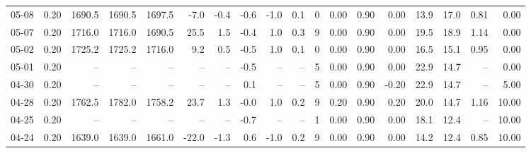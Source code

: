 \begin{threeparttable}
{\begin{tabular}{lrrrrrrrrrrrrrrrrr}
  05-08 &     0.20 & 1690.5 & 1690.5 & 1697.5 &       -7.0 &           -0.4 &                      -0.6 &                     -1.0 &                 0.1 &              0 &       0.00 &      0.90 &           0.00 &             13.9 &                17.0 &            0.81 &                   0.00 \\
  05-07 &     0.20 & 1716.0 & 1716.0 & 1690.5 &       25.5 &            1.5 &                      -0.4 &                      1.0 &                 0.3 &              9 &       0.00 &      0.90 &           0.00 &             19.5 &                18.9 &            1.14 &                   0.00 \\
  05-02 &     0.20 & 1725.2 & 1725.2 & 1716.0 &        9.2 &            0.5 &                      -0.5 &                      1.0 &                 0.1 &              0 &       0.00 &      0.90 &           0.00 &             16.5 &                15.1 &            0.95 &                   0.00 \\
  05-01 &     0.20 &     -- &     -- &     -- &         -- &             -- &                      -0.5 &                       -- &                  -- &              5 &       0.00 &      0.90 &           0.00 &             22.9 &                14.7 &              -- &                   0.00 \\
  04-30 &     0.20 &     -- &     -- &     -- &         -- &             -- &                       0.1 &                       -- &                  -- &              5 &       0.00 &      0.90 &          -0.20 &             22.9 &                14.7 &              -- &                   5.00 \\
  04-28 &     0.20 & 1762.5 & 1782.0 & 1758.2 &       23.7 &            1.3 &                      -0.0 &                      1.0 &                 0.2 &              9 &       0.20 &      0.90 &           0.20 &             20.0 &                14.7 &            1.16 &                  10.00 \\
  04-25 &     0.20 &     -- &     -- &     -- &         -- &             -- &                      -0.7 &                       -- &                  -- &              1 &       0.00 &      0.90 &           0.00 &             18.1 &                12.4 &              -- &                  10.00 \\
  04-24 &     0.20 & 1639.0 & 1639.0 & 1661.0 &      -22.0 &           -1.3 &                       0.6 &                     -1.0 &                 0.2 &              9 &       0.00 &      0.90 &           0.00 &             14.2 &                12.4 &            0.85 &                  10.00 \\

\end{tabular}}
\end{threeparttable}
